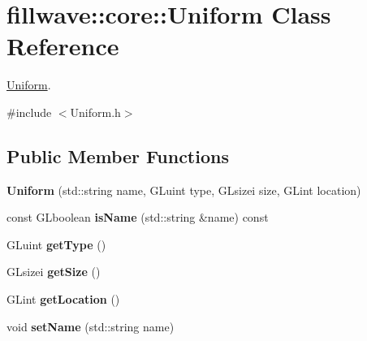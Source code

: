 \hypertarget{classfillwave_1_1core_1_1Uniform}{}\section{fillwave\+:\+:core\+:\+:Uniform Class Reference}
\label{classfillwave_1_1core_1_1Uniform}


\hyperlink{classfillwave_1_1core_1_1Uniform}{Uniform}.  




{\ttfamily \#include $<$Uniform.\+h$>$}

\subsection*{Public Member Functions}
\begin{DoxyCompactItemize}
\item 
\hypertarget{classfillwave_1_1core_1_1Uniform_a3937b3732ff724ba8767bb9d80fb122d}{}{\bfseries Uniform} (std\+::string name, G\+Luint type, G\+Lsizei size, G\+Lint location)\label{classfillwave_1_1core_1_1Uniform_a3937b3732ff724ba8767bb9d80fb122d}

\item 
\hypertarget{classfillwave_1_1core_1_1Uniform_a6dbfc634696941c77f195c07bc211cb4}{}const G\+Lboolean {\bfseries is\+Name} (std\+::string \&name) const \label{classfillwave_1_1core_1_1Uniform_a6dbfc634696941c77f195c07bc211cb4}

\item 
\hypertarget{classfillwave_1_1core_1_1Uniform_a826c679125d521d7297999c8388ccdf3}{}G\+Luint {\bfseries get\+Type} ()\label{classfillwave_1_1core_1_1Uniform_a826c679125d521d7297999c8388ccdf3}

\item 
\hypertarget{classfillwave_1_1core_1_1Uniform_a63eb3347782123b5ad0ac58ca824924e}{}G\+Lsizei {\bfseries get\+Size} ()\label{classfillwave_1_1core_1_1Uniform_a63eb3347782123b5ad0ac58ca824924e}

\item 
\hypertarget{classfillwave_1_1core_1_1Uniform_aecb26312b1554e96df23a1850d5f7db3}{}G\+Lint {\bfseries get\+Location} ()\label{classfillwave_1_1core_1_1Uniform_aecb26312b1554e96df23a1850d5f7db3}

\item 
\hypertarget{classfillwave_1_1core_1_1Uniform_a1e759add03c0a0f139b7c0a3efbbe3e1}{}void {\bfseries set\+Name} (std\+::string name)\label{classfillwave_1_1core_1_1Uniform_a1e759add03c0a0f139b7c0a3efbbe3e1}


\end{DoxyCompactItemize}
